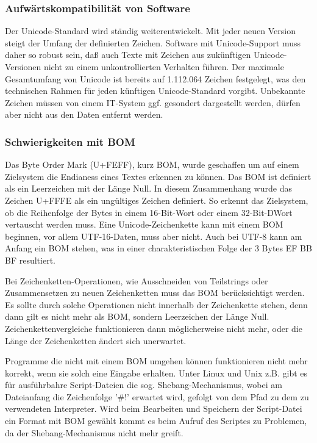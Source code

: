 \subsubsection{Aufwärtskompatibilität von Software}
Der Unicode-Standard wird ständig weiterentwickelt. Mit jeder neuen Version steigt der Umfang der definierten Zeichen.
Software mit Unicode-Support muss daher so robust sein, daß auch Texte mit Zeichen aus zukünftigen Unicode-Versionen nicht zu einem unkontrollierten Verhalten führen. Der maximale Gesamtumfang von Unicode ist bereits auf 1.112.064 Zeichen festgelegt, was den technischen Rahmen für jeden künftigen Unicode-Standard vorgibt. Unbekannte Zeichen müssen von einem IT-System ggf. gesondert dargestellt werden, dürfen aber nicht aus den Daten entfernt werden.

\subsubsection{Schwierigkeiten mit BOM}
Das Byte Order Mark (U+FEFF), kurz BOM, wurde geschaffen um auf einem Zielsystem die Endianess eines Textes erkennen zu können. 
Das BOM ist definiert als ein Leerzeichen mit der Länge Null. In diesem Zusammenhang wurde das Zeichen U+FFFE als ein ungültiges Zeichen definiert.
So erkennt das Zielsystem, ob die Reihenfolge der Bytes in einem 16-Bit-Wort oder einem 32-Bit-DWort vertauscht werden muss.
Eine Unicode-Zeichenkette kann mit einem BOM beginnen, vor allem UTF-16-Daten, muss aber nicht. 
Auch bei UTF-8 kann am Anfang ein BOM stehen, was in einer charakteristischen Folge der 3 Bytes EF BB BF resultiert.

Bei Zeichenketten-Operationen, wie Ausschneiden von Teilstrings oder Zusammensetzen zu neuen Zeichenketten muss das BOM berücksichtigt werden. Es sollte durch solche Operationen nicht innerhalb der Zeichenkette stehen, denn dann gilt es nicht mehr als BOM, sondern Leerzeichen der Länge Null. Zeichenkettenvergleiche funktionieren dann möglicherweise nicht mehr, oder die Länge der Zeichenketten ändert sich unerwartet.

Programme die nicht mit einem BOM umgehen können funktionieren nicht mehr korrekt, wenn sie solch eine Eingabe erhalten. Unter Linux und Unix z.B. gibt es für ausführbahre Script-Dateien die sog. Shebang-Mechanismus, wobei am Dateianfang die Zeichenfolge  '\#!' erwartet wird, gefolgt von dem Pfad zu dem zu verwendeten Interpreter. Wird beim Bearbeiten und Speichern der Script-Datei ein Format mit BOM gewählt kommt es beim Aufruf des Scriptes zu Problemen, da der Shebang-Mechanismus nicht mehr greift.

